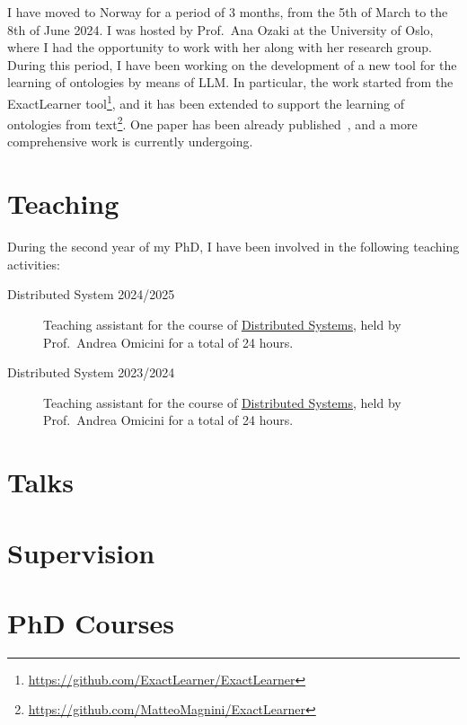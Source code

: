 \documentclass[
]{ceurart}
\begin{document}
I have moved to Norway for a period of 3 months, from the 5th of March to the 8th of June 2024.
%
I was hosted by Prof.~Ana Ozaki at the University of Oslo, where I had the opportunity to work with her along with her research group.
%
During this period, I have been working on the development of a new tool for the learning of ontologies by means of \ac{LLM}.
%
In particular, the work started from the ExactLearner tool\footnote{\url{https://github.com/ExactLearner/ExactLearner}}, and it has been extended to support the learning of ontologies from text\footnote{\url{https://github.com/MatteoMagnini/ExactLearner}}.
%
One paper has been already published~\cite{DBLP:conf/dlog/MagniniOS24}, and a more comprehensive work is currently undergoing.

\section{Teaching}
\label{sec:results}

During the second year of my PhD, I have been involved in the following teaching activities:
%
\begin{description}
    \item[Distributed System 2024/2025] Teaching assistant for the course of \href{https://www.unibo.it/it/studiare/dottorati-master-specializzazioni-e-altra-formazione/insegnamenti/insegnamento/2024/493397}{Distributed Systems}, held by Prof.~Andrea Omicini for a total of 24 hours.
    \item[Distributed System 2023/2024] Teaching assistant for the course of \href{https://www.unibo.it/it/studiare/dottorati-master-specializzazioni-e-altra-formazione/insegnamenti/insegnamento/2023/493397}{Distributed Systems}, held by Prof.~Andrea Omicini for a total of 24 hours.
\end{description}

\section{Talks}
\label{sec:talks}

\section{Supervision}
\label{sec:supervision}

\section{PhD Courses}
\label{sec:phd-courses}
\end{document}
